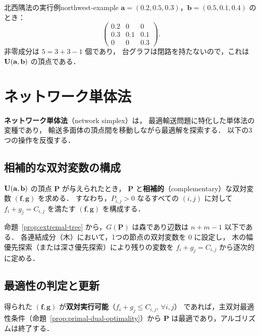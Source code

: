 \begin{example}{北西隅法の実行例}{northwest-example}
  $\mathbf{a} = (0.2, 0.5, 0.3)$，$\mathbf{b} = (0.5, 0.1, 0.4)$ のとき：
  \[
    \begin{pmatrix} 0.2 & 0 & 0 \\ 0.3 & 0.1 & 0.1 \\ 0 & 0 & 0.3 \end{pmatrix}.
  \]
  非零成分は $5 = 3 + 3 - 1$ 個であり，
  台グラフは閉路を持たないので，これは $\mathbf{U}(\mathbf{a}, \mathbf{b})$ の頂点である．
\end{example}

\section{ネットワーク単体法}
\label{sec:network-simplex}

\textbf{ネットワーク単体法}（network simplex）は，
最適輸送問題に特化した単体法の変種であり，
輸送多面体の頂点間を移動しながら最適解を探索する．
以下の3つの操作を反復する．

\subsection{相補的な双対変数の構成}
\label{subsec:dual-from-primal}

$\mathbf{U}(\mathbf{a}, \mathbf{b})$ の頂点 $\mathbf{P}$ が与えられたとき，
$\mathbf{P}$ と\textbf{相補的}（complementary）な双対変数 $(\mathbf{f}, \mathbf{g})$ を求める．
すなわち，$P_{i,j} > 0$ なるすべての $(i, j)$ に対して $f_i + g_j = C_{i,j}$ を満たす
$(\mathbf{f}, \mathbf{g})$ を構成する．

命題~\ref{prop:extremal-tree} から，$G(\mathbf{P})$ は森であり辺数は $n + m - 1$ 以下である．
各連結成分（木）において，1つの節点の双対変数を $0$ に設定し，
木の幅優先探索（または深さ優先探索）により残りの変数を
$f_i + g_j = C_{i,j}$ から逐次的に定める．

\subsection{最適性の判定と更新}

得られた $(\mathbf{f}, \mathbf{g})$ が\textbf{双対実行可能}（$f_i + g_j \leq C_{i,j}$, $\forall i, j$）
であれば，主双対最適性条件（命題~\ref{prop:primal-dual-optimality}）から
$\mathbf{P}$ は最適であり，アルゴリズムは終了する．

